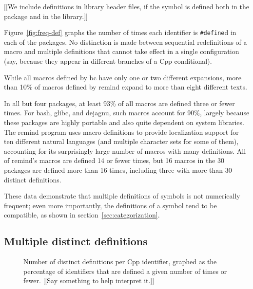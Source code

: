 \documentclass[10pt]{article}
\def\numpackages{30}
\newcommand{\pkg}[1]{\textsf{#1}}
\begin{document}
        [[We include definitions in library header files, if the symbol is defined
        both in the package and in the library.]]

        Figure~\ref{fig:freq-def} graphs the number of times each identifier is
        {\tt \#define}d in each of the packages.  No distinction is made between
        sequential redefinitions of a macro and multiple definitions that cannot
        take effect in a single configuration (say, because they appear in
        different branches of a Cpp conditional).

        While all macros defined by \pkg{bc} have only one or two different
        expansions, more than 10\% of macros defined by \pkg{remind} expand to more
        than eight different texts.

        In all but four packages, at least 93\% of all macros are defined three or
        fewer times.  For \pkg{bash}, \pkg{glibc}, and \pkg{dejagnu}, such macros account for 90\%,
        largely because these packages are highly portable and also quite dependent
        on system libraries.  The \pkg{remind} program uses macro definitions to provide
        localization support for ten different natural languages (and multiple
        character sets for some of them), accounting for its surprisingly large
        number of macros with many definitions.  All of \pkg{remind}'s macros are defined
        14 or fewer times, but 16 macros in the {\numpackages} packages are defined
        more than 16 times, including three with more than 30 distinct definitions.

        These data demonstrate that multiple definitions of symbols is not
        numerically frequent; even more importantly, the definitions of a symbol
        tend to be compatible, as shown in section~\ref{sec:categorization}.



\subsection{Multiple distinct definitions}

        \begin{figure}
        \centerline{}
        \caption{Number of distinct definitions per Cpp identifier, graphed as
          the percentage of identifiers that are defined a given number of times
          or fewer.  [[Say something to help interpret it.]]}
        \label{fig:freq-ddf-cat}
        \end{figure}
\end{document}
